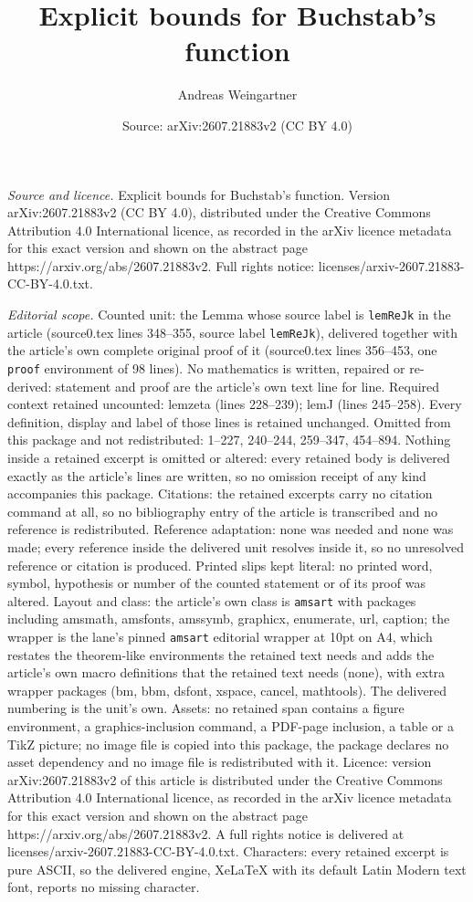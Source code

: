 \documentclass[10pt,a4paper]{amsart}
\title[Explicit bounds for Buchstab's function]{Explicit bounds for Buchstab's function}
\author{Andreas Weingartner}
\date{Source: arXiv:2607.21883v2 (CC BY 4.0)}
\begin{document}
\maketitle

\noindent\emph{Source and licence.} Explicit bounds for Buchstab's function. Version arXiv:2607.21883v2 (CC BY 4.0), distributed under the Creative Commons Attribution 4.0 International licence, as recorded in the arXiv licence metadata for this exact version and shown on the abstract page https://arxiv.org/abs/2607.21883v2. Full rights notice: licenses/arxiv-2607.21883-CC-BY-4.0.txt.\par\smallskip

\noindent\textit{Editorial scope.} Counted unit: the Lemma whose source label is \texttt{lemReJk} in the article (source0.tex lines 348--355, source label \texttt{lemReJk}), delivered together with the article's own complete original proof of it (source0.tex lines 356--453, one \texttt{proof} environment of 98 lines). No mathematics is written, repaired or re-derived: statement and proof are the article's own text line for line. Required context retained uncounted: lemzeta (lines 228--239); lemJ (lines 245--258). Every definition, display and label of those lines is retained unchanged. Omitted from this package and not redistributed: 1--227, 240--244, 259--347, 454--894. Nothing inside a retained excerpt is omitted or altered: every retained body is delivered exactly as the article's lines are written, so no omission receipt of any kind accompanies this package. Citations: the retained excerpts carry no citation command at all, so no bibliography entry of the article is transcribed and no reference is redistributed. Reference adaptation: none was needed and none was made; every reference inside the delivered unit resolves inside it, so no unresolved reference or citation is produced. Printed slips kept literal: no printed word, symbol, hypothesis or number of the counted statement or of its proof was altered. Layout and class: the article's own class is \texttt{amsart} with packages including amsmath, amsfonts, amssymb, graphicx, enumerate, url, caption; the wrapper is the lane's pinned \texttt{amsart} editorial wrapper at 10pt on A4, which restates the theorem-like environments the retained text needs and adds the article's own macro definitions that the retained text needs (none), with extra wrapper packages (bm, bbm, dsfont, xspace, cancel, mathtools). The delivered numbering is the unit's own. Assets: no retained span contains a figure environment, a graphics-inclusion command, a PDF-page inclusion, a table or a TikZ picture; no image file is copied into this package, the package declares no asset dependency and no image file is redistributed with it. Licence: version arXiv:2607.21883v2 of this article is distributed under the Creative Commons Attribution 4.0 International licence, as recorded in the arXiv licence metadata for this exact version and shown on the abstract page https://arxiv.org/abs/2607.21883v2. A full rights notice is delivered at licenses/arxiv-2607.21883-CC-BY-4.0.txt. Characters: every retained excerpt is pure ASCII, so the delivered engine, XeLaTeX with its default Latin Modern text font, reports no missing character.
\end{document}

